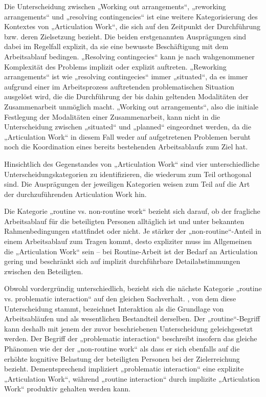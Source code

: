 Die Unterscheidung zwischen „Working out arrangements“, „reworking arrangements“ und „resolving contingencies“ ist eine weitere Kategorisierung des Kontextes von „Articulation Work“, die sich auf den Zeitpunkt der Durchführung bzw. deren Zielsetzung bezieht. Die beiden erstgenannten Ausprägungen sind dabei im Regelfall explizit, da sie eine bewusste Beschäftigung mit dem Arbeitsablauf bedingen. „Resolving contingecies“ kann je nach wahgenommener Komplexität des Problems implizit oder explizit auftreten. „Reworking arrangements“ ist wie „resolving contingecies“ immer „situated“, da es immer aufgrund einer im Arbeitsprozess auftretenden problematischen Situation ausgelöst wird, die die Durchführung der bis dahin geltenden Modalitäten der Zusammenarbeit unmöglich macht. „Working out arrangements“, also die initiale Festlegung der Modalitäten einer Zusammenarbeit, kann nicht in die Unterscheidung zwischen „situated“ und „planned“ eingeordnet werden, da die „Articulation Work“ in diesem Fall weder auf aufgetretenen Problemen beruht noch die Koordination eines bereits bestehenden Arbeitsablaufs zum Ziel hat.

Hinsichtlich des Gegenstandes von „Articulation Work“ sind vier unterschiedliche Unterscheidungskategorien zu identifizieren, die wiederum zum Teil orthogonal sind. Die Ausprägungen der jeweiligen Kategorien weisen zum Teil auf die Art der durchzuführenden Articulation Work hin. 

Die Kategorie „routine vs. non-routine work“ bezieht sich darauf, ob der fragliche Arbeitsablauf für die beteiligten Personen alltäglich ist und unter bekannten Rahmenbedingungen stattfindet oder nicht. Je stärker der „non-routine“-Anteil in einem Arbeitsablauf zum Tragen kommt, desto expliziter muss im Allgemeinen die „Articulation Work“ sein -- bei Routine-Arbeit ist der Bedarf an Articulation gering und beschränkt sich auf implizit durchführbare Detailabstimmungen zwischen den Beteiligten. 

Obwohl vordergründig unterschiedlich, bezieht sich die nächste Kategorie „routine vs. problematic interaction“ auf den gleichen Sachverhalt. \citet{Strauss93}, von dem diese Unterscheidung stammt, bezeichnet Interaktion als die Grundlage von Arbeitsabläufen und als wesentlichen Bestandteil derselben. Der „routine“-Begriff kann deshalb mit jenem der zuvor beschriebenen Unterscheidung geleichgesetzt werden. Der Begriff der „problematic interaction“ beschreibt insofern das gleiche Phänomen wie der der „non-routine work“ als dass er sich ebenfalls auf die erhöhte kognitive Belastung der beteiligten Personen bei der Zielerreichung bezieht. Dementsprechend impliziert „problematic interaction“ eine explizite „Articulation Work“, während „routine interaction“ durch implizite „Articulation Work“ produktiv gehalten werden kann.

